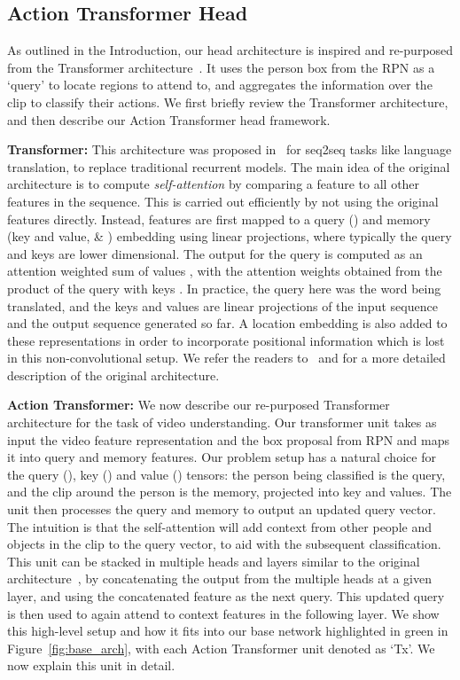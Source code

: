 \documentclass[10pt,twocolumn,letterpaper]{article}
\newcommand{\Tx}[0]{Action Transformer}
\begin{document}
\subsection{\Tx{} Head}\label{sec:app:tx_head}

As outlined  in the Introduction, our head architecture 
is inspired and
re-purposed from the Transformer
architecture~\cite{vaswani2017attention}. It uses the person box from the RPN as a
`query' to locate regions to attend to, and aggregates the information
over the clip to classify their actions.  We first 
briefly review  the Transformer architecture, and then describe our
\Tx{} head framework.

{\noindent \bf Transformer:}  This architecture was
proposed in~\cite{vaswani2017attention} for
seq2seq tasks like language translation, to replace traditional
recurrent models. The main idea of the original architecture is to compute
{\em self-attention} by comparing a feature to all other features in the sequence.
This is carried out efficiently by not using the original features directly. Instead, features
are first mapped to a
query () and memory (key and value,  \& ) embedding using
linear projections, 
where typically the query and keys are lower dimensional. 
The output for the query
is computed as an attention weighted sum of values , with  the attention weights obtained from
the product of the query  with 
keys 
. 
In practice, the query here was the word being translated, and the keys and
values are linear projections of the input sequence and the output
sequence generated so far. A location embedding is also added to these
representations in order to incorporate positional information which
is lost in this non-convolutional setup. We refer the readers
to~\cite{vaswani2017attention} and \cite{parmar2018image} for a more
detailed description of the original architecture.

{\noindent \bf \Tx{}:} We now describe our re-purposed Transformer
architecture for the task of video understanding.  Our transformer
unit takes as input the video feature representation and the box
proposal from RPN and maps it into query and memory features.
Our problem setup has a natural
choice for the 
 query (),
key () and value () tensors: the person being classified is the query,
and the
clip around the person is the memory, projected into key and values.
The unit then processes the query and
memory to output an updated query vector. 
The intuition is that the self-attention will add context from other people and objects in the clip to
the query vector, to aid with the subsequent classification.
This unit can be stacked in
multiple heads and layers similar to the original
architecture~\cite{vaswani2017attention}, by concatenating the output
from the multiple heads at a given layer, and using the concatenated
feature as the next query. This updated query is then used to again
attend to context features in the following layer. We show this high-level setup and how it fits into our base network highlighted in green in
Figure~\ref{fig:base_arch}, with each \Tx{} unit denoted as `Tx'. We now explain this unit in detail.
\end{document}
